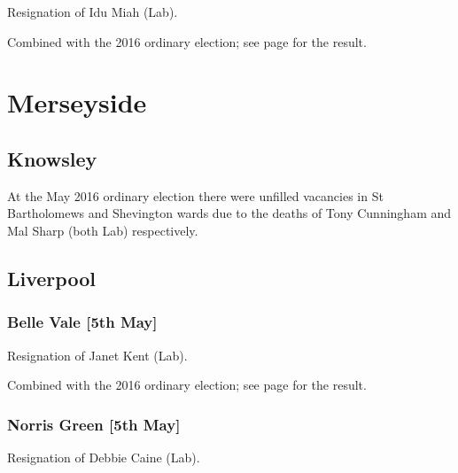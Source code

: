 \documentclass[a4paper,openany]{book}
\begin{document}
\begin{resultsiii}

Resignation of Idu Miah (Lab).

Combined with the 2016 ordinary election; see page \pageref{MossleyTameside} for the result.

\section{Merseyside}

\subsection*{Knowsley}

At the May 2016 ordinary election there were unfilled vacancies in St Bartholomews and Shevington wards due to the deaths of Tony Cunningham and Mal Sharp (both Lab) respectively.%
%

\subsection*{Liverpool}

\subsubsection*{Belle Vale \hspace*{\fill}\nolinebreak[1]%
\enspace\hspace*{\fill}
[5th May]}


Resignation of Janet Kent (Lab).

Combined with the 2016 ordinary election; see page \pageref{BelleValeLiverpool} for the result.

\subsubsection*{Norris Green \hspace*{\fill}\nolinebreak[1]%
\enspace\hspace*{\fill}
[5th May]}


Resignation of Debbie Caine (Lab).


\end{resultsiii}
\end{document}

